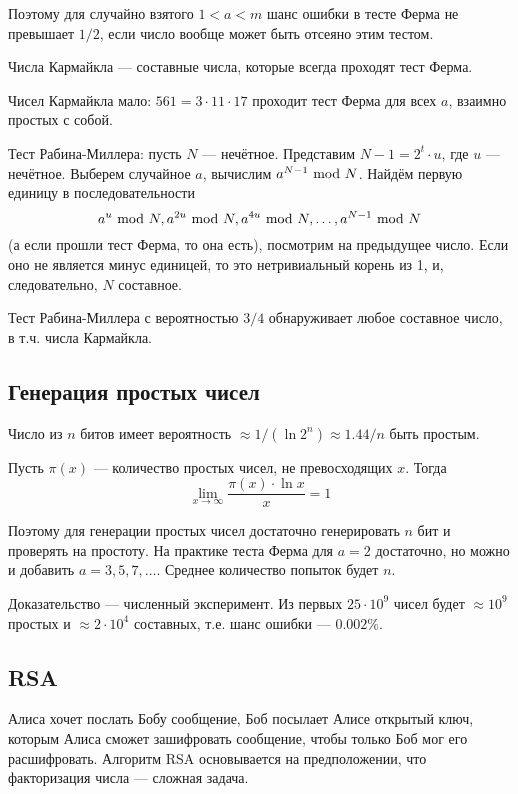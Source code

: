 Поэтому для случайно взятого $1 < a < m$
шанс ошибки в тесте Ферма не превышает $1/2$,
если число вообще может быть отсеяно этим тестом.

\begin{definition}
    Числа Кармайкла --- составные числа,
    которые всегда проходят тест Ферма.
\end{definition}
Чисел Кармайкла мало: $561 = 3 \cdot 11 \cdot 17$
проходит тест Ферма для всех $a$, взаимно простых с собой.

Тест Рабина-Миллера:
пусть $N$ --- нечётное.
Представим $N - 1 = 2^t \cdot u$,
где $u$ --- нечётное.
Выберем случайное $a$,
вычислим $a^{N - 1} ~\text{mod}~ N$.
Найдём первую единицу в последовательности
\[
    a^u ~\text{mod}~ N,
    a^{2u} ~\text{mod}~ N,
    a^{4u} ~\text{mod}~ N, \ldots,
    a^{N - 1} ~\text{mod}~ N
\]
(а если прошли тест Ферма, то она есть),
посмотрим на предыдущее число.
Если оно не является минус единицей,
то это нетривиальный корень из 1,
и, следовательно, $N$ составное.

Тест Рабина-Миллера с вероятностью $3/4$ обнаруживает
любое составное число, в т.ч. числа Кармайкла.

\subsection{Генерация простых чисел}
Число из $n$ битов имеет вероятность
$\approx 1/(\ln 2^n) \approx 1.44/n$
быть простым.

\begin{theorem}
    Пусть $\pi(x)$ --- количество простых чисел,
    не превосходящих $x$.
    Тогда
    \[ \lim_{x \to \infty} \frac{\pi(x) \cdot \ln x}{x} = 1 \]
\end{theorem}

Поэтому для генерации простых чисел достаточно
генерировать $n$ бит и проверять на простоту.
На практике теста Ферма для
$a = 2$ достаточно,
но можно и добавить $a = 3, 5, 7, \ldots$.
Среднее количество попыток будет $n$.

Доказательство --- численный эксперимент.
Из первых $25 \cdot 10^9$ чисел
будет $\approx 10^9$ простых
и $\approx 2 \cdot 10^4$ составных,
т.е. шанс ошибки --- $0.002\%$.

\subsection{RSA}
Алиса хочет послать Бобу сообщение,
Боб посылает Алисе открытый ключ,
которым Алиса сможет зашифровать сообщение,
чтобы только Боб мог его расшифровать.
Алгоритм RSA основывается на предположении,
что факторизация числа --- сложная задача.

